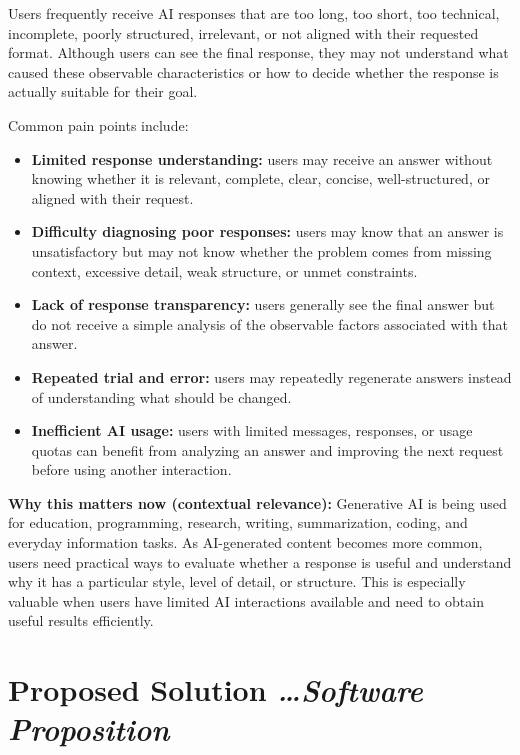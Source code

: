 \documentclass[11pt,a4paper]{article}
\newcommand{\BvrHint}[1]{%
  {\normalfont\normalsize\itshape\hfill #1}}
\begin{document}
Users frequently receive AI responses that are too long, too short, too
technical, incomplete, poorly structured, irrelevant, or not aligned with
their requested format. Although users can see the final response, they may
not understand what caused these observable characteristics or how to decide
whether the response is actually suitable for their goal.

Common pain points include:

\begin{itemize}[leftmargin=0.7cm]
    \item \textbf{Limited response understanding:} users may receive an
    answer without knowing whether it is relevant, complete, clear,
    concise, well-structured, or aligned with their request.
    \item \textbf{Difficulty diagnosing poor responses:} users may know that
    an answer is unsatisfactory but may not know whether the problem comes
    from missing context, excessive detail, weak structure, or unmet
    constraints.
    \item \textbf{Lack of response transparency:} users generally see the
    final answer but do not receive a simple analysis of the observable
    factors associated with that answer.
    \item \textbf{Repeated trial and error:} users may repeatedly regenerate
    answers instead of understanding what should be changed.
    \item \textbf{Inefficient AI usage:} users with limited messages,
    responses, or usage quotas can benefit from analyzing an answer and
    improving the next request before using another interaction.
\end{itemize}

\textbf{Why this matters now (contextual relevance):} Generative AI is being
used for education, programming, research, writing, summarization, coding,
and everyday information tasks. As AI-generated content becomes more common,
users need practical ways to evaluate whether a response is useful and
understand why it has a particular style, level of detail, or structure.
This is especially valuable when users have limited AI interactions available
and need to obtain useful results efficiently.

\section{Proposed Solution%
  \BvrHint{\ldots Software Proposition}}
\end{document}
